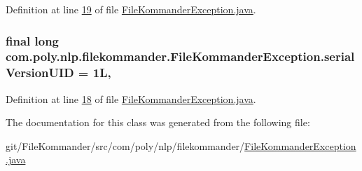 Definition at line \hyperlink{L19}{19} of file \hyperlink{}{File\-Kommander\-Exception.\-java}.

\hypertarget{classcom_1_1poly_1_1nlp_1_1filekommander_1_1_file_kommander_exception_a19ff8f8a19fadb69b360aa6f211065c6}{
\subsubsection[{serial\-Version\-U\-I\-D}]{\setlength{\rightskip}{0pt plus 5cm}final long com.\-poly.\-nlp.\-filekommander.\-File\-Kommander\-Exception.\-serial\-Version\-U\-I\-D = 1\-L\hspace{0.3cm}{\ttfamily [static]}, {\ttfamily [private]}}}\label{classcom_1_1poly_1_1nlp_1_1filekommander_1_1_file_kommander_exception_a19ff8f8a19fadb69b360aa6f211065c6}


Definition at line \hyperlink{L18}{18} of file \hyperlink{}{File\-Kommander\-Exception.\-java}.



The documentation for this class was generated from the following file\-:\begin{DoxyCompactItemize}
\item 
git/\-File\-Kommander/src/com/poly/nlp/filekommander/\hyperlink{_file_kommander_exception_8java}{File\-Kommander\-Exception.\-java}\end{DoxyCompactItemize}
